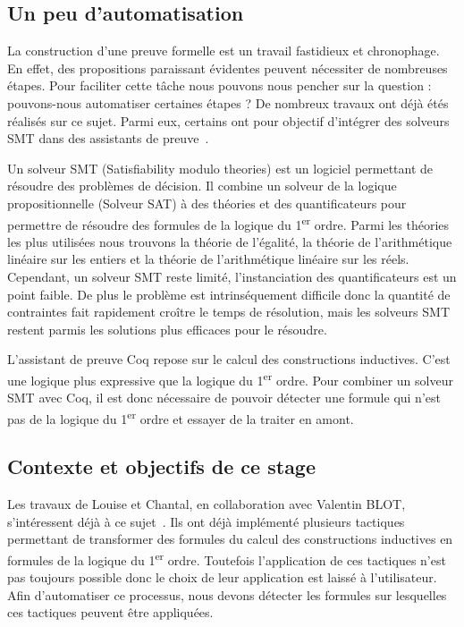 \documentclass[french,titlepage]{article}
\begin{document}
\subsection{Un peu d'automatisation} \label{intro:automatisation}
La construction d'une preuve formelle est un travail fastidieux et chronophage. En effet, des propositions paraissant évidentes peuvent nécessiter de nombreuses étapes. Pour faciliter cette tâche nous pouvons nous pencher sur la question : pouvons-nous automatiser certaines étapes ? De nombreux travaux ont déjà étés réalisés sur ce sujet. Parmi eux, certains ont pour objectif d'intégrer des solveurs SMT dans des assistants de preuve~\cite{DBLP:conf/cpp/ArmandFGKTW11}.

Un solveur SMT (Satisfiability modulo theories) est un logiciel permettant de résoudre des problèmes de décision. Il combine un solveur de la logique propositionnelle (Solveur SAT) à des théories et des quantificateurs pour permettre de résoudre des formules de la logique du 1\textsuperscript{er} ordre. Parmi les théories les plus utilisées nous trouvons la théorie de l'égalité, la théorie de l'arithmétique linéaire sur les entiers et la théorie de l'arithmétique linéaire sur les réels. Cependant, un solveur SMT reste limité, l'instanciation des quantificateurs est un point faible. De plus le problème est intrinséquement difficile donc la quantité de contraintes fait rapidement croître le temps de résolution, mais les solveurs SMT restent parmis les solutions plus efficaces pour le résoudre.

L'assistant de preuve Coq repose sur le calcul des constructions inductives. C'est une logique plus expressive que la logique du 1\textsuperscript{er} ordre. Pour combiner un solveur SMT avec Coq, il est donc nécessaire de pouvoir détecter une formule qui n'est pas de la logique du 1\textsuperscript{er} ordre et essayer de la traiter en amont.


\subsection{Contexte et objectifs de ce stage} \label{intro:objectifs}
Les travaux de Louise et Chantal, en collaboration avec Valentin BLOT, s'intéressent déjà à ce sujet~\cite{DBLP:journals/corr/abs-2107-02353,DBLP:conf/cpp/Blot0CPKMV23}. Ils ont déjà implémenté plusieurs tactiques permettant de transformer des formules du calcul des constructions inductives en formules de la logique du 1\textsuperscript{er} ordre. Toutefois l'application de ces tactiques n'est pas toujours possible donc le choix de leur application est laissé à l'utilisateur. Afin d'automatiser ce processus, nous devons détecter les formules sur lesquelles ces tactiques peuvent être appliquées.
\end{document}
